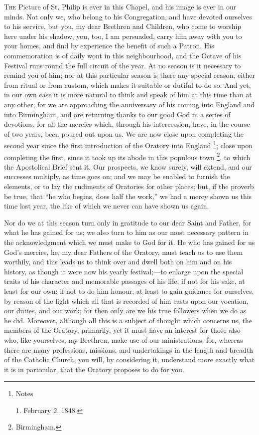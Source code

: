 T\textsc{he} Picture of St. Philip is ever in this Chapel, and
his image is ever in our minds. Not only we, who belong
to his Congregation, and have devoted ourselves to his
service, but you, my dear Brethren and Children, who come
to worship here under his shadow, you, too, I am
persuaded, carry him away with you to your homes, and
find by experience the benefit of such a Patron. His
commemoration is of daily wont in this neighbourhood, and
the Octave of his Festival runs round the full circuit of
the year. At no season is it necessary to remind you of
him; nor at this particular season is there any special
reason, either from ritual or from custom, which makes it
suitable or dutiful to do so. And yet, in our own case it
is more natural to think and speak of him at this time
than at any other, for we are approaching the anniversary
of his coming into England and into Birmingham, and are
returning thanks to our good God in a series of
devotions, for all the mercies which, through his
intercession, have, in the course of two years, been
poured out upon us. We are now close upon completing the
second year since the first introduction of the Oratory
into England \footnote{Notes

1. February 2, 1848.}; close upon completing the first, since it took
up its abode in this populous town \footnote{Birmingham.}, to which the Apostolical
Brief sent it. Our prospects, we know surely, will
extend, and our successes multiply, as time goes on; and
we may be enabled to furnish the elements, or to lay the
rudiments of Oratories for other places; but, if the
proverb be true, that ``he who begins, does half the
work,'' we had a mercy shown us this time last year,
the like of which we never can have shown us again.

Nor do we at this season turn only in gratitude to our
dear Saint and Father, for what he has gained for us; we
also turn to him as our most necessary pattern in the
acknowledgment which we must make to God for it. He who
has gained for us God's mercies, he, my dear Fathers of
the Oratory, must teach us to use them worthily, and this
leads us to think over and dwell both on him and on his
history, as though it were now his yearly
festival;—to enlarge upon the special traits of his
character and memorable passages of his life, if not for his sake, at least for our own; if not to do him honour,
at least to gain guidance for ourselves, by reason of the
light which all that is recorded of him casts upon our
vocation, our duties, and our work; for then only are we
his true followers when we do as he did. Moreover,
although all this is a subject of thought which concerns
us, the members of the Oratory, primarily, yet it must
have an interest for those also who, like yourselves, my
Brethren, make use of our ministrations; for, whereas
there are many professions, missions, and undertakings in
the length and breadth of the Catholic Church, you will,
by considering it, understand more exactly what it is in
particular, that the Oratory proposes to do for you.

